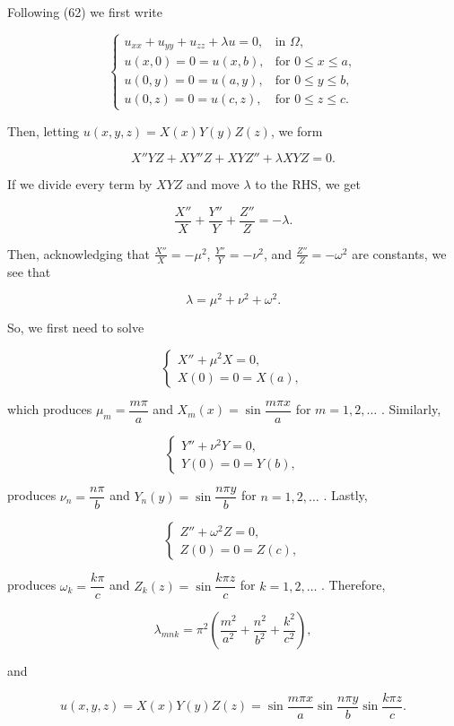 \documentclass{article}
\begin{document}
Following (62) we first write

\[
  \begin{cases}
  u_{xx} + u_{yy} + u_{zz} + \lambda u=0, &\text{in $\Omega$}, \\
  u(x,0)=0=u(x,b), & \text{for $0\leq x \leq a$}, \\
  u(0,y)=0=u(a,y), & \text{for $0\leq y \leq b$}, \\
  u(0,z)=0=u(c,z), & \text{for $0\leq z \leq c$}.
  \end{cases}
\]

Then, letting $u(x,y,z)=X(x)Y(y)Z(z)$, we form

$$X''YZ + XY''Z + XYZ'' + \lambda XYZ =0.$$

If we divide every term by $XYZ$ and move $\lambda$ to the RHS, we get

$$\frac{X''}{X} + \frac{Y''}{Y} + \frac{Z''}{Z} = - \lambda .$$

Then, acknowledging that $\frac{X''}{X}=-\mu^2$, $\frac{Y''}{Y}=-\nu^2$, and $\frac{Z''}{Z}=-\omega^2$ are constants, we see that

$$\lambda=\mu^2+\nu^2+\omega^2.$$

So, we first need to solve

\[
  \begin{cases}
  X''+\mu^2 X=0, \\
  X(0)=0=X(a),
  \end{cases}
\]

which produces $\mu_m=\dfrac{m\pi}{a}$ and $X_m(x)=\sin{\dfrac{m\pi x}{a}}$ for $m=1,2,\dots$ . Similarly,

\[
  \begin{cases}
  Y''+\nu^2 Y=0, \\
  Y(0)=0=Y(b),
  \end{cases}
\]

produces $\nu_n=\dfrac{n\pi}{b}$ and $Y_n(y)=\sin{\dfrac{n\pi y}{b}}$ for $n=1,2,\dots$ . Lastly,

\[
  \begin{cases}
  Z''+\omega^2 Z=0, \\
  Z(0)=0=Z(c),
  \end{cases}
\]

produces $\omega_k=\dfrac{k\pi}{c}$ and $Z_k(z)=\sin{\dfrac{k\pi z}{c}}$ for $k=1,2,\dots$ . Therefore,

$$\lambda_{mnk}=\pi^2\left(\frac{m^2}{a^2}+\frac{n^2}{b^2}+\frac{k^2}{c^2}\right),$$

and

$$u(x,y,z)=X(x)Y(y)Z(z)=\sin{\dfrac{m\pi x}{a}}\sin{\dfrac{n\pi y}{b}}\sin{\dfrac{k\pi z}{c}}.$$
\end{document}
